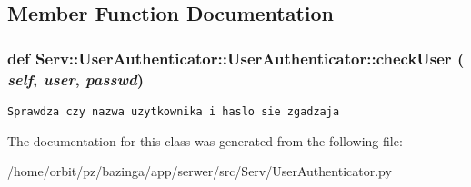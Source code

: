 \subsection{Member Function Documentation}
\hypertarget{class_serv_1_1_user_authenticator_1_1_user_authenticator_df35019818eb86047a9c8d1d415bf3e5}{
\subsubsection[{checkUser}]{\setlength{\rightskip}{0pt plus 5cm}def Serv::UserAuthenticator::UserAuthenticator::checkUser ( {\em self}, \/   {\em user}, \/   {\em passwd})}}
\label{class_serv_1_1_user_authenticator_1_1_user_authenticator_df35019818eb86047a9c8d1d415bf3e5}




\footnotesize\begin{verbatim}Sprawdza czy nazwa uzytkownika i haslo sie zgadzaja

\end{verbatim}
\normalsize
 

The documentation for this class was generated from the following file:\begin{CompactItemize}
\item 
/home/orbit/pz/bazinga/app/serwer/src/Serv/UserAuthenticator.py\end{CompactItemize}
